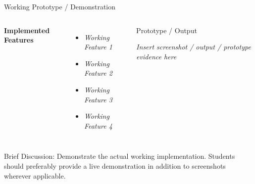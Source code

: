 \documentclass[aspectratio=169,11pt]{beamer}
\newcommand{\smallnote}[1]{%
\vspace{0.08cm}
{\scriptsize\color{GEUGrey}#1}
}
\newcommand{\placeholder}[1]{%
\textit{\color{GEUGrey}#1}
}
\begin{document}
\begin{frame}{Working Prototype / Demonstration}

\begin{columns}[T,totalwidth=\textwidth]


\textbf{\color{GEUBlue}Implemented Features}

\begin{itemize}\itemsep3pt
\item \placeholder{Working Feature 1}
\item \placeholder{Working Feature 2}
\item \placeholder{Working Feature 3}
\item \placeholder{Working Feature 4}
\end{itemize}


\begin{block}{Prototype / Output}

\centering
\vspace{8mm}

\placeholder{
Insert screenshot / output /
prototype evidence here
}

\vspace{8mm}

\end{block}

\end{columns}

\vfill

\smallnote{
Brief Discussion: Demonstrate the actual working implementation.
Students should preferably provide a live demonstration in addition
to screenshots wherever applicable.
}

\end{frame}
\end{document}
